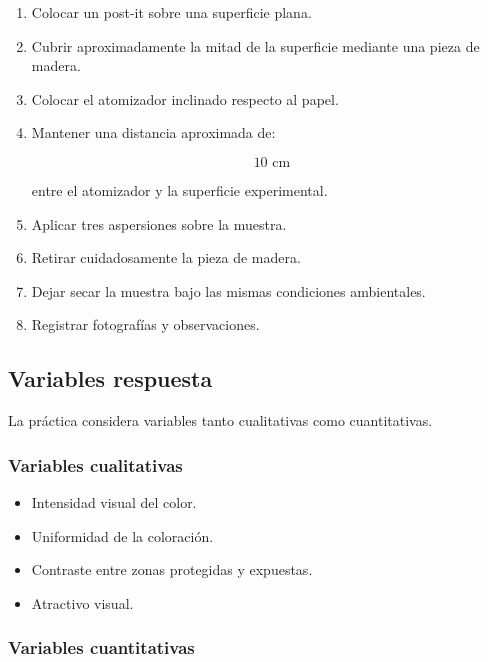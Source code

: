 \begin{enumerate}
\item Colocar un post-it sobre una superficie plana.

\item Cubrir aproximadamente la mitad de la superficie mediante una pieza de madera.

\item Colocar el atomizador inclinado respecto al papel.

\item Mantener una distancia aproximada de:

\[
10 \text{ cm}
\]

entre el atomizador y la superficie experimental.

\item Aplicar tres aspersiones sobre la muestra.

\item Retirar cuidadosamente la pieza de madera.

\item Dejar secar la muestra bajo las mismas condiciones ambientales.

\item Registrar fotografías y observaciones.
\end{enumerate}

\subsection{Variables respuesta}

La práctica considera variables tanto cualitativas como cuantitativas.

\subsubsection{Variables cualitativas}

\begin{itemize}
\item Intensidad visual del color.
\item Uniformidad de la coloración.
\item Contraste entre zonas protegidas y expuestas.
\item Atractivo visual.
\end{itemize}

\subsubsection{Variables cuantitativas}

